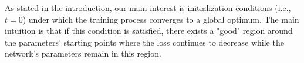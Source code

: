 \documentclass[twoside]{article}
\begin{document}
As stated in the introduction, our main interest is initialization conditions (i.e., $t=0$) under which the training process converges to a global optimum.
The main intuition is that if this condition is satisfied, there exists a "good" region around the parameters' starting points where the loss continues to decrease while the network's parameters remain in this region.


\end{document}
